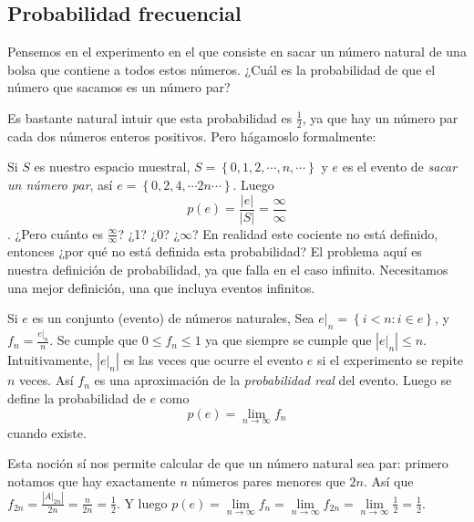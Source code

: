 \documentclass[spanish]{report}
\newcommand{\card}[1]{\left|#1 \right|}
\begin{document}
\subsection*{Probabilidad frecuencial}

Pensemos en el experimento en el que consiste en sacar un número natural de una bolsa que contiene a todos estos números. ¿Cuál es la probabilidad de que el número que sacamos es un número par?

Es bastante natural intuir que esta probabilidad es $\frac{1}{2}$, ya que hay un número par cada dos números enteros positivos. Pero hágamoslo formalmente:

Si $S$ es nuestro espacio muestral, $S= \left\lbrace 0, 1, 2, \cdots, n, \cdots \right\rbrace$ y $e$ es el evento de \emph{sacar un número par}, así $e= \left\lbrace 0, 2, 4, \cdots 2n \cdots \right\rbrace$. Luego \[p(e) = \frac{\card{e}}{\card{S}} = \frac{\infty}{\infty} \].
¿Pero cuánto es $\frac{\infty}{\infty}$? ¿1? ¿0? ¿$\infty$?
En realidad este cociente no está definido, entonces ¿por qué no está definida esta probabilidad? El problema aquí es nuestra definición de probabilidad, %
ya que falla en el caso infinito. Necesitamos una mejor definición, una que incluya eventos infinitos.

Si $e$ es un conjunto (evento) de números naturales, Sea $e|_n = \left\lbrace i < n : i \in e \right\rbrace$, y $f_n = \frac{e|_n}{n}$. Se cumple que $0 \leq f_n \leq 1$ ya que siempre se cumple que $\card{e|_n} \leq n$.
Intuitivamente, $\card{e|_n}$ es las veces que ocurre el evento $e$ si el experimento se repite $n$ veces. Así $f_n$ es una aproximación de la \emph{probabilidad real} del evento.
Luego se define la probabilidad de $e$ como \[p(e) = \lim\limits_{n \to \infty} f_n\] cuando existe.

Esta noción sí nos permite calcular de que un número natural sea par:
primero notamos que hay exactamente $n$ números pares menores que $2n$. Así que $f_{2n}= \frac{\card{A|_{2n}}}{2n}=\frac{n}{2n}=\frac{1}{2}$.
Y luego $p(e) = \lim\limits_{n \to \infty} f_n = \lim\limits_{n \to \infty} f_{2n}= \lim\limits_{n \to \infty}\frac{1}{2} = \frac{1}{2}$.
\end{document}
